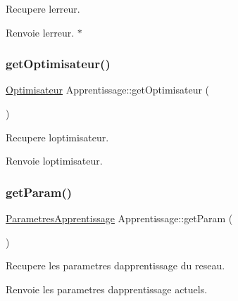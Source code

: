 Recupere l\textquotesingle{}erreur. 

\begin{DoxyReturn}{Renvoie}
l\textquotesingle{}erreur. $\ast$ 
\end{DoxyReturn}
\mbox{\label{classApprentissage_af3fdf7d92ebf36d3edb6c4d06addc8e6}} 
\subsubsection{\texorpdfstring{get\+Optimisateur()}{getOptimisateur()}}
{\footnotesize\ttfamily \hyperlink{classOptimisateur}{Optimisateur} Apprentissage\+::get\+Optimisateur (\begin{DoxyParamCaption}{ }\end{DoxyParamCaption})}



Recupere l\textquotesingle{}optimisateur. 

\begin{DoxyReturn}{Renvoie}
l\textquotesingle{}optimisateur.\textquotesingle{} 
\end{DoxyReturn}
\mbox{\label{classApprentissage_a025d66e8c5edb1c4c6ce9f3d8c983395}} 
\subsubsection{\texorpdfstring{get\+Param()}{getParam()}}
{\footnotesize\ttfamily \hyperlink{classParametresApprentissage}{Parametres\+Apprentissage} Apprentissage\+::get\+Param (\begin{DoxyParamCaption}{ }\end{DoxyParamCaption})}



Recupere les parametres d\textquotesingle{}apprentissage du reseau. 

\begin{DoxyReturn}{Renvoie}
les parametres d\textquotesingle{}apprentissage actuels. 
\end{DoxyReturn}
\mbox{\label{classApprentissage_a56d2b6eff05342d1482bfed2a947b60d}} 
